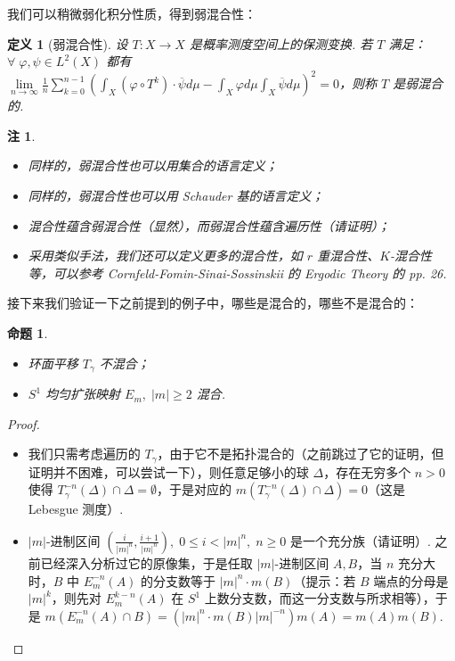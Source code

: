 \documentclass[11pt, a4paper, oneside]{ctexart}
\newtheorem{definition}[theorem]{定义}
\newtheorem{proposition}[theorem]{命题}
\newtheorem{remark}[theorem]{注}
\newcommand{\abs}[1]{\left|{#1}\right|}
\begin{document}
    我们可以稍微弱化积分性质，得到弱混合性：
    \begin{definition}[弱混合性]
        设 $T:X\to X$ 是概率测度空间上的保测变换. 若 $T$ 满足：$\forall\;\varphi,\psi\in L^2(X)$ 都有 $\lim\limits_{n\to\infty}\frac{1}{n}\sum\limits_{k=0}^{n-1}{(\int_{X}(\varphi\circ T^k)\cdot \overline{\psi} d\mu-\int_{X}\varphi d\mu\int_{X}\overline{\psi} d\mu)}^2=0$，则称 $T$ 是弱混合的.
    \end{definition}
    \begin{remark}
        \begin{itemize}
            \item 同样的，弱混合性也可以用集合的语言定义；
            \item 同样的，弱混合性也可以用 Schauder 基的语言定义；
            \item 混合性蕴含弱混合性（显然），而弱混合性蕴含遍历性（请证明）；
            \item 采用类似手法，我们还可以定义更多的混合性，如 $r$ 重混合性、$K$-混合性等，可以参考 Cornfeld-Fomin-Sinai-Sossinskii 的 Ergodic Theory 的 pp. 26.
        \end{itemize}
    \end{remark}

    接下来我们验证一下之前提到的例子中，哪些是混合的，哪些不是混合的：
    \begin{proposition}
        \begin{itemize}
            \item 环面平移 $T_{\gamma}$ 不混合；
            \item $S^1$ 均匀扩张映射 $E_m,\; \abs{m}\geq 2$ 混合.
        \end{itemize}
    \end{proposition}
    \begin{proof}
        \begin{itemize}
            \item 我们只需考虑遍历的 $T_{\gamma}$，由于它不是拓扑混合的（之前跳过了它的证明，但证明并不困难，可以尝试一下），则任意足够小的球 $\Delta$，存在无穷多个 $n>0$ 使得 $T_{\gamma}^{-n}(\Delta)\cap \Delta=\emptyset$，于是对应的 $m(T_{\gamma}^{-n}(\Delta)\cap \Delta)=0$（这是 Lebesgue 测度）.
            \item $\abs{m}$-进制区间 $(\frac{i}{\abs{m}^n},\frac{i+1}{\abs{m}^n}),\; 0\leq i<\abs{m}^n,\; n\geq 0$ 是一个充分族（请证明）. 之前已经深入分析过它的原像集，于是任取 $\abs{m}$-进制区间 $A,B$，当 $n$ 充分大时，$B$ 中 $E_m^{-n}(A)$ 的分支数等于 $\abs{m}^n\cdot m(B)$（提示：若 $B$ 端点的分母是 $\abs{m}^k$，则先对 $E_m^{k-n}(A)$ 在 $S^1$ 上数分支数，而这一分支数与所求相等），于是 $m(E_m^{-n}(A)\cap B)=(\abs{m}^n\cdot m(B)\abs{m}^{-n})m(A)=m(A)m(B)$.
        \end{itemize}
    \end{proof}
\end{document}
